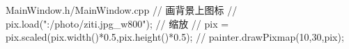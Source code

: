 \documentclass[
   projtype=report, %
   output=print,     %
  ]{nwafuprojrep}
\begin{document}
\begin{langCVOne}[C++][code10][QT]{MainWindow.h/MainWindow.cpp}
{    //  画背景上图标
    //  pix.load(":/photo/ziti.jpg_w800");
    //  缩放
    //  pix = pix.scaled(pix.width()*0.5,pix.height()*0.5);
    //  painter.drawPixmap(10,30,pix);
}
\end{langCVOne}
\end{document}
